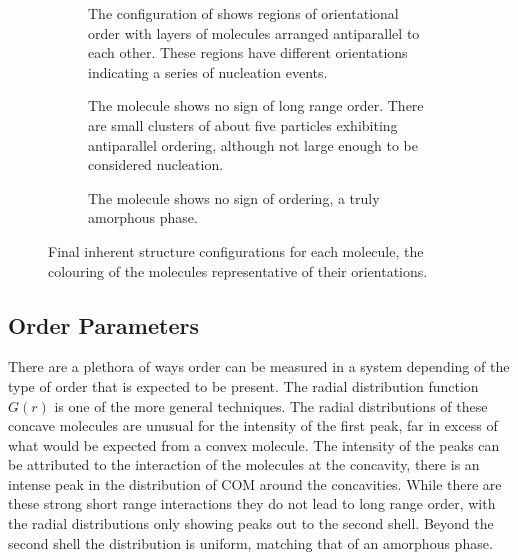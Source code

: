\begin{figure}
    \centering
    \begin{subfigure}{0.5\linewidth}
        \caption{The configuration of \sone shows regions of orientational order with layers of molecules arranged antiparallel to each other. These regions have different orientations indicating a series of nucleation events.}
        \label{fig:sone inherent}
    \end{subfigure}
    \begin{subfigure}{0.5\linewidth}%
        \caption{The \scon molecule shows no sign of long range order. There are small clusters of about five particles exhibiting antiparallel ordering, although not large enough to be considered nucleation.}
        \label{fig:scon inherent}
    \end{subfigure}
    \begin{subfigure}{0.5\linewidth}
        \caption{The \tri molecule shows no sign of ordering, a truly amorphous phase.}
        \label{fig:scon inherent}
    \end{subfigure}
    \caption{Final inherent structure configurations for each molecule, the colouring of the molecules representative of their orientations.}
    \label{fig:inherent structures frame}
\end{figure}

\subsection{Order Parameters}

There are a plethora of ways order can be measured in a system depending of the type of order that is expected to be present. The radial distribution function $G(r)$ is one of the more general techniques. The radial distributions  of these concave molecules are unusual for the intensity of the first peak, far in excess of what would be expected from a convex molecule. The intensity of the peaks can be attributed to the interaction of the molecules at the concavity, there is an intense peak in the distribution of COM  around the concavities. While there are these strong short range interactions they do not lead to long range order, with the radial distributions only showing peaks out to the second shell. Beyond the second shell the distribution is uniform, matching that of an amorphous phase.

